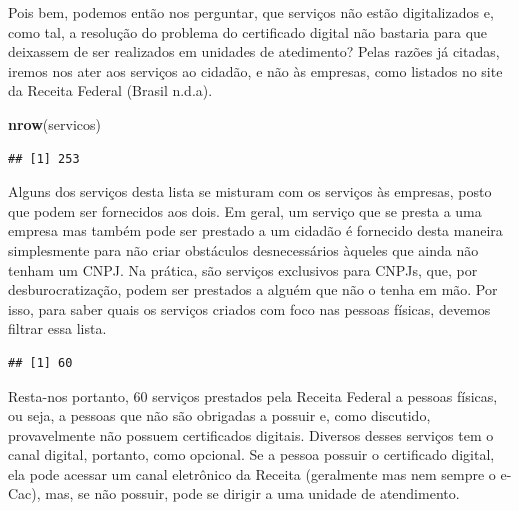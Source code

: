 \documentclass[]{article}
\newenvironment{Shaded}{\begin{snugshade}}{\end{snugshade}}
\newcommand{\KeywordTok}[1]{\textcolor[rgb]{0.13,0.29,0.53}{\textbf{#1}}}
\newcommand{\NormalTok}[1]{#1}
\newcommand{\OperatorTok}[1]{\textcolor[rgb]{0.81,0.36,0.00}{\textbf{#1}}}
\newcommand{\StringTok}[1]{\textcolor[rgb]{0.31,0.60,0.02}{#1}}
\begin{document}
Pois bem, podemos então nos perguntar, que serviços não estão
digitalizados e, como tal, a resolução do problema do certificado
digital não bastaria para que deixassem de ser realizados em unidades de
atedimento? Pelas razões já citadas, iremos nos ater aos serviços ao
cidadão, e não às empresas, como listados no site da Receita Federal
(Brasil n.d.a).

\begin{Shaded}
\begin{Highlighting}[]
\KeywordTok{nrow}\NormalTok{(servicos)}
\end{Highlighting}
\end{Shaded}

\begin{verbatim}
## [1] 253
\end{verbatim}

Alguns dos serviços desta lista se misturam com os serviços às empresas,
posto que podem ser fornecidos aos dois. Em geral, um serviço que se
presta a uma empresa mas também pode ser prestado a um cidadão é
fornecido desta maneira simplesmente para não criar obstáculos
desnecessários àqueles que ainda não tenham um CNPJ. Na prática, são
serviços exclusivos para CNPJs, que, por desburocratização, podem ser
prestados a alguém que não o tenha em mão. Por isso, para saber quais os
serviços criados com foco nas pessoas físicas, devemos filtrar essa
lista.

\begin{Shaded}
\end{Shaded}

\begin{verbatim}
## [1] 60
\end{verbatim}

Resta-nos portanto, 60 serviços prestados pela Receita Federal a pessoas
físicas, ou seja, a pessoas que não são obrigadas a possuir e, como
discutido, provavelmente não possuem certificados digitais. Diversos
desses serviços tem o canal digital, portanto, como opcional. Se a
pessoa possuir o certificado digital, ela pode acessar um canal
eletrônico da Receita (geralmente mas nem sempre o e-Cac), mas, se não
possuir, pode se dirigir a uma unidade de atendimento.
\end{document}
